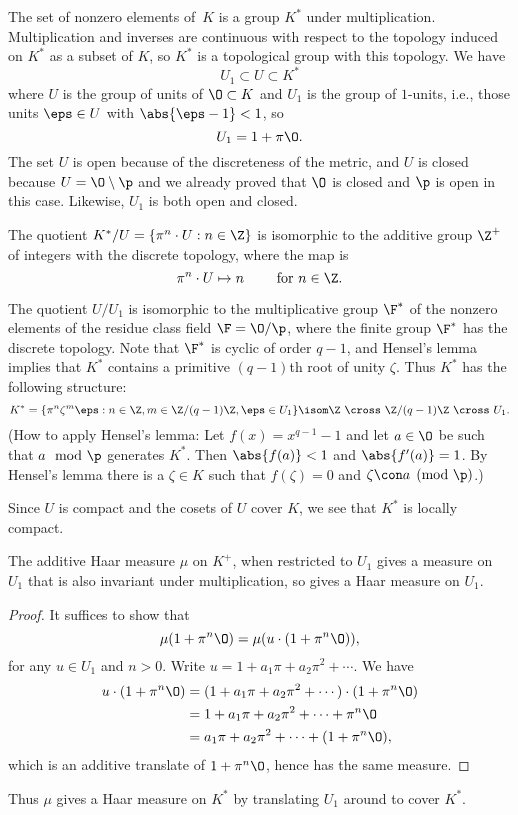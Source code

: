 \documentclass[11pt]{book}
\begin{document}
\begin{ch}
The set of nonzero elements of~$K$ is a group $K^*$ under
multiplication.  Multiplication and inverses are continuous with
respect to the topology induced on $K^*$ as a subset of $K$, so $K^*$
is a topological group with this topology.  We have
$$
  U_1 \subset U \subset K^*
  $$
  where $U$ is the group of units of $\O\subset K$ and $U_1$ is
  the group of $1$-units, i.e., those units $\eps\in U$ with
  $\abs{\eps-1}<1$, so
  $$U_1 = 1 + \pi\O.$$
  The set $U$ is open because of the discreteness of the metric, and $U$ is closed because $U = \O \setminus \p$ and we already proved that $\O$ is closed and $\p$ is open in this case.  Likewise, $U_1$ is both open and closed.

  The quotient $K^*/U = \{ \pi^n \cdot U : n \in \Z\}$ is isomorphic to the additive group $\Z^+$
of integers with the discrete topology, where the map is
$$
 \pi^n\cdot U \mapsto n  \qquad \text{ for } n\in\Z.
 $$

The quotient
 $U/U_1$ is isomorphic to the multiplicative group $\F^*$ of the
 nonzero elements of the residue class field $\F = \O/\p$, where the finite group
 $\F^*$ has the discrete topology.
Note that $\F^*$ is cyclic
 of order $q-1$, and Hensel's lemma implies that $K^*$ contains a
 primitive $(q-1)$th root of unity $\zeta$.  Thus $K^*$ has
the following structure:
$$
K^* = \{ \pi^n\zeta^m\eps : n\in \Z, m\in\Z/(q-1)\Z, \eps\in U_1\}
\isom \Z\,\, \cross\,\, \Z/(q-1)\Z \,\,\cross\,\, U_1.
$$
(How to apply Hensel's lemma: Let $f(x) = x^{q-1}-1$ and let
$a\in\O$ be such that $a\mod\p$ generates $K^*$.  Then $\abs{f(a)}<1$
and $\abs{f'(a)}=1$.  By Hensel's lemma  there is a
$\zeta\in K$ such that $f(\zeta)=0$ and $\zeta\con a\pmod{\p}$.)

Since $U$ is compact and the cosets of $U$ cover $K$, we see that
$K^*$ is locally compact.
\begin{lemma}
The additive Haar measure $\mu$ on $K^+$,
when restricted to $U_1$ gives a measure on $U_1$ that is also
invariant under multiplication, so gives a Haar measure on $U_1$.
\end{lemma}
\begin{proof}
It suffices to show that
$$\mu(1+\pi^n\O) = \mu(u\cdot(1+\pi^n\O)),$$
for any $u\in U_1$ and $n>0$.
Write $u=1+a_1\pi + a_2\pi^2 +\cdots$.
We have
\begin{align*}
 u\cdot (1+\pi^n\O) &= (1+a_1\pi + a_2\pi^2 +\cdots)\cdot (1+\pi^n\O)\\
  &= 1+a_1\pi + a_2\pi^2 + \cdots + \pi^n\O\\
  &= a_1\pi + a_2\pi^2 + \cdots + ( 1+\pi^n\O),
\end{align*}
which is an additive translate of $1+\pi^n\O$, hence has the
same measure.
\end{proof}
Thus $\mu$ gives a Haar measure on $K^*$ by translating $U_1$ around
to cover $K^*$.


\end{ch}
\end{document}
